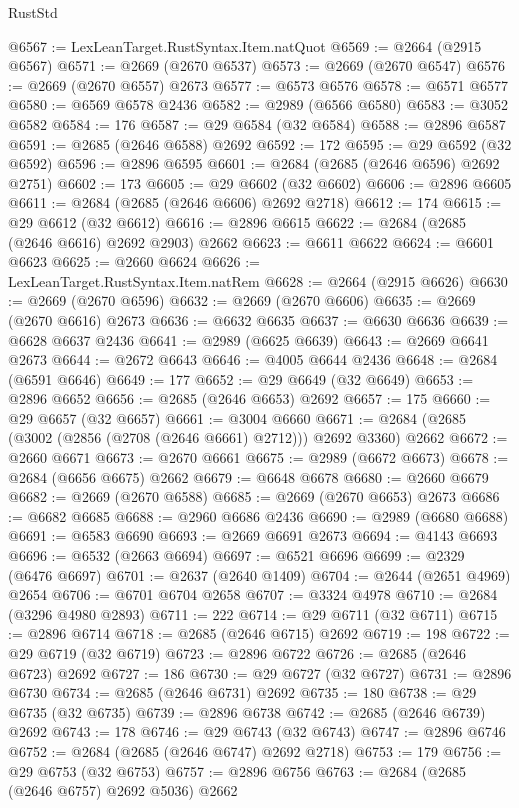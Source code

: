 \begin{lexlean}{RustStd}
\begin{coremodule}
@6567 := LexLeanTarget.RustSyntax.Item.natQuot
@6569 := @2664 (@2915 @6567)
@6571 := @2669 (@2670 @6537)
@6573 := @2669 (@2670 @6547)
@6576 := @2669 (@2670 @6557) @2673
@6577 := @6573 @6576
@6578 := @6571 @6577
@6580 := @6569 @6578 @2436
@6582 := @2989 (@6566 @6580)
@6583 := @3052 @6582
@6584 := 176
@6587 := @29 @6584 (@32 @6584)
@6588 := @2896 @6587
@6591 := @2685 (@2646 @6588) @2692
@6592 := 172
@6595 := @29 @6592 (@32 @6592)
@6596 := @2896 @6595
@6601 := @2684 (@2685 (@2646 @6596) @2692 @2751)
@6602 := 173
@6605 := @29 @6602 (@32 @6602)
@6606 := @2896 @6605
@6611 := @2684 (@2685 (@2646 @6606) @2692 @2718)
@6612 := 174
@6615 := @29 @6612 (@32 @6612)
@6616 := @2896 @6615
@6622 := @2684 (@2685 (@2646 @6616) @2692 @2903) @2662
@6623 := @6611 @6622
@6624 := @6601 @6623
@6625 := @2660 @6624
@6626 := LexLeanTarget.RustSyntax.Item.natRem
@6628 := @2664 (@2915 @6626)
@6630 := @2669 (@2670 @6596)
@6632 := @2669 (@2670 @6606)
@6635 := @2669 (@2670 @6616) @2673
@6636 := @6632 @6635
@6637 := @6630 @6636
@6639 := @6628 @6637 @2436
@6641 := @2989 (@6625 @6639)
@6643 := @2669 @6641 @2673
@6644 := @2672 @6643
@6646 := @4005 @6644 @2436
@6648 := @2684 (@6591 @6646)
@6649 := 177
@6652 := @29 @6649 (@32 @6649)
@6653 := @2896 @6652
@6656 := @2685 (@2646 @6653) @2692
@6657 := 175
@6660 := @29 @6657 (@32 @6657)
@6661 := @3004 @6660
@6671 := @2684 (@2685 (@3002 (@2856 (@2708 (@2646 @6661) @2712))) @2692 @3360) @2662
@6672 := @2660 @6671
@6673 := @2670 @6661
@6675 := @2989 (@6672 @6673)
@6678 := @2684 (@6656 @6675) @2662
@6679 := @6648 @6678
@6680 := @2660 @6679
@6682 := @2669 (@2670 @6588)
@6685 := @2669 (@2670 @6653) @2673
@6686 := @6682 @6685
@6688 := @2960 @6686 @2436
@6690 := @2989 (@6680 @6688)
@6691 := @6583 @6690
@6693 := @2669 @6691 @2673
@6694 := @4143 @6693
@6696 := @6532 (@2663 @6694)
@6697 := @6521 @6696
@6699 := @2329 (@6476 @6697)
@6701 := @2637 (@2640 @1409)
@6704 := @2644 (@2651 @4969) @2654
@6706 := @6701 @6704 @2658
@6707 := @3324 @4978
@6710 := @2684 (@3296 @4980 @2893)
@6711 := 222
@6714 := @29 @6711 (@32 @6711)
@6715 := @2896 @6714
@6718 := @2685 (@2646 @6715) @2692
@6719 := 198
@6722 := @29 @6719 (@32 @6719)
@6723 := @2896 @6722
@6726 := @2685 (@2646 @6723) @2692
@6727 := 186
@6730 := @29 @6727 (@32 @6727)
@6731 := @2896 @6730
@6734 := @2685 (@2646 @6731) @2692
@6735 := 180
@6738 := @29 @6735 (@32 @6735)
@6739 := @2896 @6738
@6742 := @2685 (@2646 @6739) @2692
@6743 := 178
@6746 := @29 @6743 (@32 @6743)
@6747 := @2896 @6746
@6752 := @2684 (@2685 (@2646 @6747) @2692 @2718)
@6753 := 179
@6756 := @29 @6753 (@32 @6753)
@6757 := @2896 @6756
@6763 := @2684 (@2685 (@2646 @6757) @2692 @5036) @2662

\end{coremodule}
\end{lexlean}
